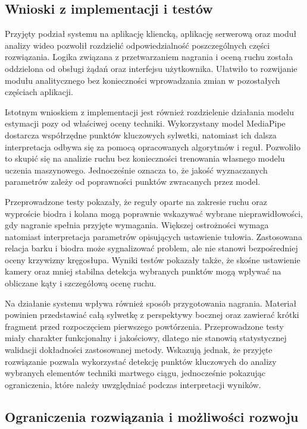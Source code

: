 \subsection*{Wnioski z implementacji i testów}

Przyjęty podział systemu na aplikację kliencką, aplikację serwerową oraz moduł analizy wideo pozwolił rozdzielić odpowiedzialność poszczególnych części rozwiązania. Logika związana z przetwarzaniem nagrania i oceną ruchu została oddzielona od obsługi żądań oraz interfejsu użytkownika. Ułatwiło to rozwijanie modułu analitycznego bez konieczności wprowadzania zmian w pozostałych częściach aplikacji.

Istotnym wnioskiem z implementacji jest również rozdzielenie działania modelu estymacji pozy od właściwej oceny techniki. Wykorzystany model MediaPipe dostarcza współrzędne punktów kluczowych sylwetki, natomiast ich dalsza interpretacja odbywa się za pomocą opracowanych algorytmów i reguł. Pozwoliło to skupić się na analizie ruchu bez konieczności trenowania własnego modelu uczenia maszynowego. Jednocześnie oznacza to, że jakość wyznaczanych parametrów zależy od poprawności punktów zwracanych przez model.

Przeprowadzone testy pokazały, że reguły oparte na zakresie ruchu oraz wyproście biodra i kolana mogą poprawnie wskazywać wybrane nieprawidłowości, gdy nagranie spełnia przyjęte wymagania. Większej ostrożności wymaga natomiast interpretacja parametrów opisujących ustawienie tułowia. Zastosowana relacja barku i biodra może sygnalizować problem, ale nie stanowi bezpośredniej oceny krzywizny kręgosłupa. Wyniki testów pokazały także, że skośne ustawienie kamery oraz mniej stabilna detekcja wybranych punktów mogą wpływać na obliczane kąty i szczegółową ocenę ruchu.

Na działanie systemu wpływa również sposób przygotowania nagrania. Materiał powinien przedstawiać całą sylwetkę z perspektywy bocznej oraz zawierać krótki fragment przed rozpoczęciem pierwszego powtórzenia. Przeprowadzone testy miały charakter funkcjonalny i jakościowy, dlatego nie stanowią statystycznej walidacji dokładności zastosowanej metody. Wskazują jednak, że przyjęte rozwiązanie pozwala wykorzystać detekcję punktów kluczowych do analizy wybranych elementów techniki martwego ciągu, jednocześnie pokazując ograniczenia, które należy uwzględniać podczas interpretacji wyników.

\subsection*{Ograniczenia rozwiązania i możliwości rozwoju}

